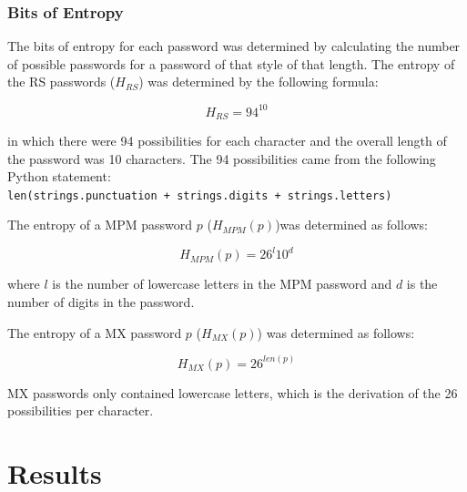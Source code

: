 \documentclass{article}
\begin{document}
\subsubsection*{Bits of Entropy}
The bits of entropy for each password was determined by calculating the number of possible passwords for a password of that style of that length. The entropy of the RS passwords ($H_{RS}$) was determined by the following formula:

$$H_{RS} = 94^{10}$$

in which there were 94 possibilities for each character and the overall length of the password was 10 characters. The 94 possibilities came from the following Python statement: \\

\texttt{len(strings.punctuation + strings.digits + strings.letters)}

The entropy of a MPM password $p$ ($H_{MPM}(p)$)was determined as follows:

$$H_{MPM}(p) = 26^l10^d$$

where $l$ is the number of lowercase letters in the MPM password and $d$ is the number of digits in the password.

The entropy of a MX password $p$ ($H_{MX}(p)$) was determined as follows:

$$H_{MX}(p) = 26^{len(p)}$$

MX passwords only contained lowercase letters, which is the derivation of the 26 possibilities per character.

\FloatBarrier
\section*{Results}
\end{document}
